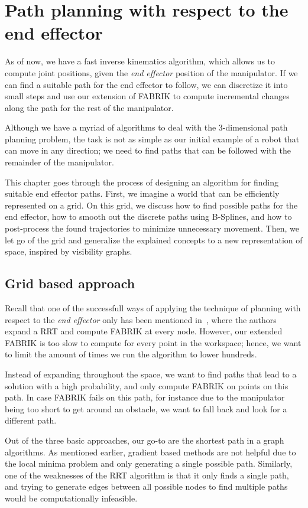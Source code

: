 \chapter{Path planning with respect to the end effector}

As of now, we have a fast inverse kinematics algorithm, which allows us to compute joint positions, given the \textit{end effector} position of the manipulator. If we can find a suitable path for the end effector to follow, we can discretize it into small steps and use our extension of FABRIK to compute incremental changes along the path for the rest of the manipulator.

Although we have a myriad of algorithms to deal with the 3-dimensional path planning problem, the task is not as simple as our initial example of a robot that can move in any direction; we need to find paths that can be followed with the remainder of the manipulator.

This chapter goes through the process of designing an algorithm for finding suitable end effector paths. First, we imagine a world that can be efficiently represented on a grid. On this grid, we discuss how to find possible paths for the end effector, how to smooth out the discrete paths using B-Splines, and how to post-process the found trajectories to minimize unnecessary movement. Then, we let go of the grid and generalize the explained concepts to a new representation of space, inspired by visibility graphs.

\section{Grid based approach}

Recall that one of the successfull ways of applying the technique of planning with respect to the \textit{end effector} only has been mentioned in~\cite{rrt_fabrik}, where the authors expand a RRT and compute FABRIK at every node. However, our extended FABRIK is too slow to compute for every point in the workspace; hence, we want to limit the amount of times we run the algorithm to lower hundreds.

Instead of expanding throughout the space, we want to find paths that lead to a solution with a high probability, and only compute FABRIK on points on this path. In case FABRIK fails on this path, for instance due to the manipulator being too short to get around an obstacle, we want to fall back and look for a different path.

Out of the three basic approaches, our go-to are the shortest path in a graph algorithms. As mentioned earlier, gradient based methods are not helpful due to the local minima problem and only generating a single possible path. Similarly, one of the weaknesses of the RRT algorithm is that it only finds a single path, and trying to generate edges between all possible nodes to find multiple paths would be computationally infeasible.

